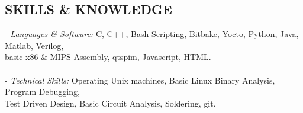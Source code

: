 \documentclass[line, 12pt]{res}
\newcommand\tab[1][0.5cm]{\hspace*{#1}}
\begin{document}
\begin{resume}
\section{SKILLS \& KNOWLEDGE} 
	- {\sl Languages \& Software:} C, C++, Bash Scripting, Bitbake, Yocto, Python, Java, Matlab, Verilog, \\ \tab[4.48cm] basic x86 \& MIPS Assembly, qtspim, Javascript, HTML. \\ \\
	- {\sl Technical Skills:} Operating Unix machines, Basic Linux Binary Analysis, Program Debugging, \\ \tab[3.25cm] Test Driven Design, Basic Circuit Analysis, Soldering, git.
 

\end{resume}
\end{document}
